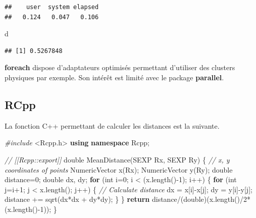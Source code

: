 \documentclass[
  11pt,
  french,
  a4paper,
  extrafontsizes,onecolumn,openright
  ]{memoir}
\newenvironment{Shaded}{\begin{snugshade}}{\end{snugshade}}
\newcommand{\CommentTok}[1]{\textcolor[rgb]{0.56,0.35,0.01}{\textit{#1}}}
\newcommand{\ControlFlowTok}[1]{\textcolor[rgb]{0.13,0.29,0.53}{\textbf{#1}}}
\newcommand{\DataTypeTok}[1]{\textcolor[rgb]{0.13,0.29,0.53}{#1}}
\newcommand{\DecValTok}[1]{\textcolor[rgb]{0.00,0.00,0.81}{#1}}
\newcommand{\ImportTok}[1]{#1}
\newcommand{\KeywordTok}[1]{\textcolor[rgb]{0.13,0.29,0.53}{\textbf{#1}}}
\newcommand{\NormalTok}[1]{#1}
\newcommand{\PreprocessorTok}[1]{\textcolor[rgb]{0.56,0.35,0.01}{\textit{#1}}}
\begin{document}
\begin{verbatim}
##    user  system elapsed 
##   0.124   0.047   0.106
\end{verbatim}

\begin{Shaded}
\begin{Highlighting}[]
\NormalTok{d}
\end{Highlighting}
\end{Shaded}

\begin{verbatim}
## [1] 0.5267848
\end{verbatim}

\normalsize

\textbf{foreach} dispose d'adaptateurs optimisés permettant d'utiliser des clusters physiques par exemple.
Son intérêt est limité avec le package \textbf{parallel}.

\hypertarget{rcpp}{%
\subsection{RCpp}\label{rcpp}}

La fonction C++ permettant de calculer les distances est la suivante.

\scriptsize

\begin{Shaded}
\begin{Highlighting}[]
\PreprocessorTok{\#include }\ImportTok{\textless{}Rcpp.h\textgreater{}}
\KeywordTok{using} \KeywordTok{namespace}\NormalTok{ Rcpp;}

\CommentTok{// [[Rcpp::export]]}
\DataTypeTok{double}\NormalTok{ MeanDistance(SEXP Rx, SEXP Ry) \{}
  \CommentTok{// x, y coordinates of points}
\NormalTok{  NumericVector x(Rx);}
\NormalTok{  NumericVector y(Ry);}
  \DataTypeTok{double}\NormalTok{ distance=}\DecValTok{0}\NormalTok{;}
  \DataTypeTok{double}\NormalTok{ dx, dy;}
  \ControlFlowTok{for}\NormalTok{ (}\DataTypeTok{int}\NormalTok{ i=}\DecValTok{0}\NormalTok{; i \textless{} (x.length(){-}}\DecValTok{1}\NormalTok{); i++) \{}
    \ControlFlowTok{for}\NormalTok{ (}\DataTypeTok{int}\NormalTok{ j=i+}\DecValTok{1}\NormalTok{; j \textless{} x.length(); j++) \{}
    \CommentTok{// Calculate distance}
\NormalTok{        dx = x[i]{-}x[j];}
\NormalTok{        dy = y[i]{-}y[j];}
\NormalTok{        distance += sqrt(dx*dx + dy*dy);}
\NormalTok{    \}}
\NormalTok{  \}}
  \ControlFlowTok{return}\NormalTok{ distance/(}\DataTypeTok{double}\NormalTok{)(x.length()/}\DecValTok{2}\NormalTok{*(x.length(){-}}\DecValTok{1}\NormalTok{));}
\NormalTok{\}}
\end{Highlighting}
\end{Shaded}
\end{document}

